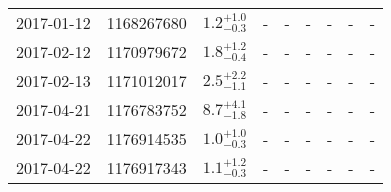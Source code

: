 \documentclass[preprint, trackchanges]{aastex61}
\newcommand\aastex{AAS\TeX}
\begin{document}
\begin{longtable}{|c|c|c|c|c|c|c|c|c|}
	2017-01-12 & 1168267680 & $ 1.2^{+1.0}_{-0.3}$ & - & - & - & - & - & - \\
	2017-02-12 & 1170979672 & $ 1.8^{+1.2}_{-0.4}$ & - & - & - & - & - & - \\
	2017-02-13 & 1171012017 & $ 2.5^{+2.2}_{-1.1}$ & - & - & - & - & - & - \\
	2017-04-21 & 1176783752 & $ 8.7^{+4.1}_{-1.8}$ & - & - & - & - & - & - \\
	2017-04-22 & 1176914535 & $ 1.0^{+1.0}_{-0.3}$ & - & - & - & - & - & - \\
	2017-04-22 & 1176917343 & $ 1.1^{+1.2}_{-0.3}$ & - & - & - & - & - & - \\
	\hline
\end{longtable} 
\endgroup








\listofchanges
\end{document}
